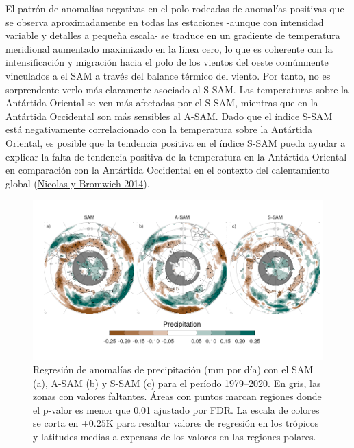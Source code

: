 \documentclass[12pt,oneside,a4paper]{reedthesis}
\begin{document}
El patrón de anomalías negativas en el polo rodeadas de anomalías positivas que se observa aproximadamente en todas las estaciones -aunque con intensidad variable y detalles a pequeña escala- se traduce en un gradiente de temperatura meridional aumentado maximizado en la línea cero, lo que es coherente con la intensificación y migración hacia el polo de los vientos del oeste comúnmente vinculados a el SAM a través del balance térmico del viento.
Por tanto, no es sorprendente verlo más claramente asociado al S-SAM.
Las temperaturas sobre la Antártida Oriental se ven más afectadas por el S-SAM, mientras que en la Antártida Occidental son más sensibles al A-SAM.
Dado que el índice S-SAM está negativamente correlacionado con la temperatura sobre la Antártida Oriental, es posible que la tendencia positiva en el índice S-SAM pueda ayudar a explicar la falta de tendencia positiva de la temperatura en la Antártida Oriental en comparación con la Antártida Occidental en el contexto del calentamiento global (\protect\hyperlink{ref-nicolas2014}{Nicolas y Bromwich 2014}).



\begin{figure}

{\centering \includegraphics{figures/30-sam/global-pp-1} 

}

\caption{Regresión de anomalías de precipitación (mm por día) con el SAM (a), A-SAM (b) y S-SAM (c) para el período 1979--2020. En gris, las zonas con valores faltantes. Áreas con puntos marcan regiones donde el p-valor es menor que 0,01 ajustado por FDR. La escala de colores se corta en \(\pm0.25 \mathrm{K}\) para resaltar valores de regresión en los trópicos y latitudes medias a expensas de los valores en las regiones polares.}\label{fig:global-pp}
\end{figure}
\end{document}
